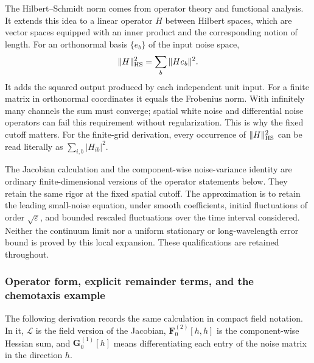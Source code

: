 \documentclass{article}
\begin{document}
The Hilbert--Schmidt norm comes from operator theory and functional analysis. It extends this idea to a linear operator $H$ between Hilbert spaces, which are vector spaces equipped with an inner product and the corresponding notion of length. For an orthonormal basis $\{e_b\}$ of the input noise space,
\begin{equation}
    \|H\|_{\rm HS}^2=\sum_b\|He_b\|^2.
\end{equation}
It adds the squared output produced by each independent unit input. For a finite matrix in orthonormal coordinates it equals the Frobenius norm. With infinitely many channels the sum must converge; spatial white noise and differential noise operators can fail this requirement without regularization. This is why the fixed cutoff matters. For the finite-grid derivation, every occurrence of $\|H\|_{\rm HS}^2$ can be read literally as $\sum_{i,b}|H_{ib}|^2$.

\begin{keybox}
The Jacobian calculation and the component-wise noise-variance identity are ordinary finite-dimensional versions of the operator statements below. They retain the same rigor at the fixed spatial cutoff. The approximation is to retain the leading small-noise equation, under smooth coefficients, initial fluctuations of order $\sqrt{\varepsilon}$, and bounded rescaled fluctuations over the time interval considered. Neither the continuum limit nor a uniform stationary or long-wavelength error bound is proved by this local expansion. These qualifications are retained throughout.
\end{keybox}

\subsubsection{Operator form, explicit remainder terms, and the chemotaxis example}

The following derivation records the same calculation in compact field notation. In it, $\mathcal L$ is the field version of the Jacobian, $\mathbf F_0^{(2)}[h,h]$ is the component-wise Hessian sum, and $\mathbf G_0^{(1)}[h]$ means differentiating each entry of the noise matrix in the direction $h$.
\end{document}
